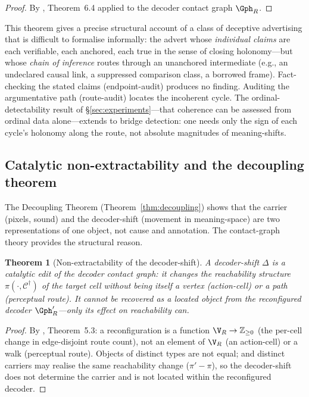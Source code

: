 \documentclass[twocolumn,11pt,a4paper]{article}
\theoremstyle{adv}
\newtheorem{theorem}{Theorem}[section]
\theoremstyle{definition}
\theoremstyle{remark}
\newcommand{\Cell}{\mathcal{C}}        %
\newcommand{\Recv}{R}                  %
\newcommand{\shift}{\Delta}            %
\begin{document}
\begin{proof}
By \citet{sachikonye2025knowledge}, Theorem~6.4 applied to the decoder contact
graph $\Gph_\Recv$.
\end{proof}

This theorem gives a precise structural account of a class of deceptive
advertising that is difficult to formalise informally: the advert whose
\emph{individual claims} are each verifiable, each anchored, each true in the
sense of closing holonomy---but whose \emph{chain of inference} routes through
an unanchored intermediate (e.g., an undeclared causal link, a suppressed
comparison class, a borrowed frame). Fact-checking the stated claims
(endpoint-audit) produces no finding. Auditing the argumentative path
(route-audit) locates the incoherent cycle. The ordinal-detectability result of
\S\ref{sec:experiments}---that coherence can be assessed from ordinal data
alone---extends to bridge detection: one needs only the sign of each cycle's
holonomy along the route, not absolute magnitudes of meaning-shifts.

\subsection{Catalytic non-extractability and the decoupling theorem}

The Decoupling Theorem (Theorem~\ref{thm:decoupling}) shows that the carrier
(pixels, sound) and the decoder-shift (movement in meaning-space) are two
representations of one object, not cause and annotation. The contact-graph
theory provides the structural reason.

\begin{theorem}[Non-extractability of the decoder-shift]
\label{thm:non-extract}
A decoder-shift $\shift$ is a catalytic edit of the decoder contact graph: it
changes the reachability structure $\pi(\cdot,\Cell^\dagger)$ of the target cell
without being itself a vertex (action-cell) or a path (perceptual route). It
cannot be recovered as a located object from the reconfigured decoder
$\Gph'_\Recv$---only its effect on reachability can.
\end{theorem}

\begin{proof}
By \citet{sachikonye2025knowledge}, Theorem~5.3: a reconfiguration is a
function $\V_\Recv\to\mathbb{Z}_{\ge0}$ (the per-cell change in edge-disjoint
route count), not an element of $\V_\Recv$ (an action-cell) or a walk
(perceptual route). Objects of distinct types are not equal; and distinct
carriers may realise the same reachability change ($\pi'-\pi$), so the
decoder-shift does not determine the carrier and is not located within the
reconfigured decoder.
\end{proof}
\end{document}

